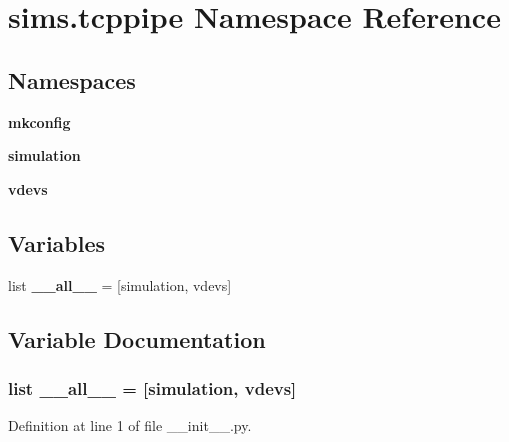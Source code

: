 \section{sims.\+tcppipe Namespace Reference}
\label{namespacesims_1_1tcppipe}
\subsection*{Namespaces}
\begin{DoxyCompactItemize}
\item 
 {\bf mkconfig}
\item 
 {\bf simulation}
\item 
 {\bf vdevs}
\end{DoxyCompactItemize}
\subsection*{Variables}
\begin{DoxyCompactItemize}
\item 
list {\bf \+\_\+\+\_\+all\+\_\+\+\_\+} = [\textquotesingle{}simulation\textquotesingle{}, \textquotesingle{}vdevs\textquotesingle{}]
\end{DoxyCompactItemize}


\subsection{Variable Documentation}
\subsubsection[{\+\_\+\+\_\+all\+\_\+\+\_\+}]{\setlength{\rightskip}{0pt plus 5cm}list \+\_\+\+\_\+all\+\_\+\+\_\+ = [\textquotesingle{}simulation\textquotesingle{}, \textquotesingle{}vdevs\textquotesingle{}]}\label{namespacesims_1_1tcppipe_aa4a022e6ddacd362b83964da5cc5d044}


Definition at line 1 of file \+\_\+\+\_\+init\+\_\+\+\_\+.\+py.

